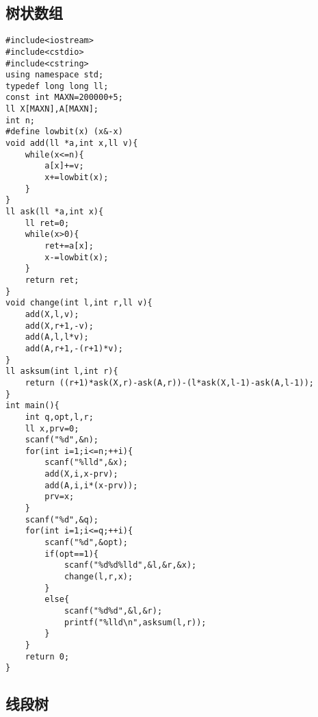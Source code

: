 \documentclass[UTF8]{ctexart}
\begin{document}
\subsection{树状数组}
\begin{lstlisting}
#include<iostream>
#include<cstdio>
#include<cstring>
using namespace std;
typedef long long ll;
const int MAXN=200000+5;
ll X[MAXN],A[MAXN];
int n;
#define lowbit(x) (x&-x)
void add(ll *a,int x,ll v){
    while(x<=n){
        a[x]+=v;
        x+=lowbit(x);
    }
}
ll ask(ll *a,int x){
    ll ret=0;
    while(x>0){
        ret+=a[x];
        x-=lowbit(x);
    }
    return ret;
}
void change(int l,int r,ll v){
    add(X,l,v);
    add(X,r+1,-v);
    add(A,l,l*v);
    add(A,r+1,-(r+1)*v);
}
ll asksum(int l,int r){
    return ((r+1)*ask(X,r)-ask(A,r))-(l*ask(X,l-1)-ask(A,l-1));
}
int main(){
    int q,opt,l,r;
    ll x,prv=0;
    scanf("%d",&n);
    for(int i=1;i<=n;++i){
        scanf("%lld",&x);
        add(X,i,x-prv);
        add(A,i,i*(x-prv));
        prv=x;
    }
    scanf("%d",&q);
    for(int i=1;i<=q;++i){
        scanf("%d",&opt);
        if(opt==1){
            scanf("%d%d%lld",&l,&r,&x);
            change(l,r,x);
        }
        else{
            scanf("%d%d",&l,&r);
            printf("%lld\n",asksum(l,r));
        }
    }
    return 0;
}    
\end{lstlisting}
\subsection{线段树}
\end{document}
